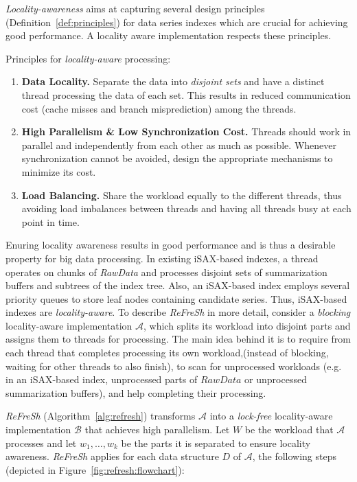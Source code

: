 {\em Locality-awareness}  aims at capturing several design principles (Definition~\ref{def:principles})
for data series indexes which are crucial for achieving good performance.
A locality aware implementation respects these principles. 
% 
\begin{definition}
\label{def:principles}
Principles for {\em locality-aware} processing:
\begin{enumerate}
\item
{\bf Data Locality.} Separate the data into {\em disjoint sets} and have a distinct thread
processing the data of each set. This results in reduced communication 
cost (cache misses and branch misprediction) among the threads.
\item
{\bf High Parallelism \& Low Synchronization Cost.} 
Threads should work in parallel and independently from each other as much as possible. 
Whenever synchronization cannot be avoided, design the appropriate 
mechanisms to minimize its cost.
\item
{\bf Load Balancing.} Share the workload equally to the different threads, thus
avoiding load imbalances between threads and having all threads busy at each
point in time. 

\end{enumerate}
\end{definition}
% 
Enuring locality awareness results in good performance and is thus 
a desirable property for big data processing. In existing iSAX-based indexes, 
a thread operates on chunks of \textit{RawData} and processes disjoint sets of summarization
buffers and subtrees of the index tree. Also, an iSAX-based index employs 
several priority queues to store leaf nodes containing candidate series.
Thus, iSAX-based indexes are {\em locality-aware}.
% 
To describe \textit{ReFreSh} in more detail, consider a {\em blocking} locality-aware
implementation $\mathcal{A}$, which splits its workload into disjoint parts and assigns them to 
threads for processing. 
% 
The main idea behind it is to require from each thread that completes processing
its own workload,(instead of blocking, waiting for other threads to also finish), 
to scan for unprocessed workloads (e.g. in an iSAX-based index, unprocessed parts of $RawData$
or unprocessed summarization buffers), and help completing their processing. 

\textit{ReFreSh} (Algorithm~\ref{alg:refresh}) transforms $\mathcal{A}$ into a {\em lock-free} 
locality-aware implementation $\mathcal{B}$ that achieves high parallelism. 
% 
Let $W$ be the workload that $\mathcal{A}$ processes 
and let $w_1, \ldots, w_k$ be the parts it is separated to ensure locality awareness.
\textit{ReFreSh} applies for each data structure $D$ of $\mathcal{A}$, 
the following steps (depicted in Figure~\ref{fig:refresh:flowchart}):


